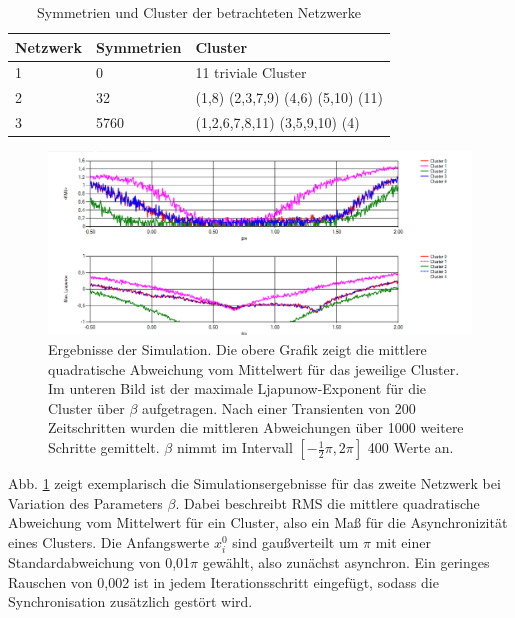 \begin{table}[]
	\begin{center}
		\caption{Symmetrien und Cluster der betrachteten Netzwerke}
		\label{tab:netzwerke} 
		
		\begin{tabular}{lll}
			Netzwerk & Symmetrien & Cluster                           \\
			\hline
			1        & 0          & 11 triviale Cluster               \\
			2        & 32         & (1,8) (2,3,7,9) (4,6) (5,10) (11) \\
			3        & 5760       & (1,2,6,7,8,11) (3,5,9,10) (4) \\  
			\hline
		\end{tabular}
	\end{center}
\end{table}
\begin{figure}
	\centering
	\includegraphics[width=1.0\textwidth]{abb/misc/ljapResult.png}
	\caption{Ergebnisse der Simulation. Die obere Grafik zeigt die mittlere quadratische Abweichung vom Mittelwert für das jeweilige Cluster. Im unteren Bild ist der maximale Ljapunow-Exponent für die Cluster über $\beta$ aufgetragen. Nach einer Transienten von 200 Zeitschritten wurden die mittleren Abweichungen über 1000 weitere Schritte gemittelt. $\beta$ nimmt im Intervall $[-\frac{1}{2}\pi,2\pi]$ 400 Werte an.}
	\label{fig:ljapResult}
\end{figure}
Abb. \ref{fig:ljapResult} zeigt exemplarisch die Simulationsergebnisse für das zweite Netzwerk bei Variation des Parameters $\beta$. Dabei beschreibt RMS die mittlere quadratische Abweichung vom Mittelwert für ein Cluster, also ein Maß für die Asynchronizität eines Clusters. Die Anfangswerte $x_i^0$ sind gaußverteilt um $\pi$ mit einer Standardabweichung von 0,01$\pi$ gewählt, also zunächst asynchron. Ein geringes Rauschen von 0,002 ist in jedem Iterationsschritt eingefügt, sodass die Synchronisation zusätzlich gestört wird.
